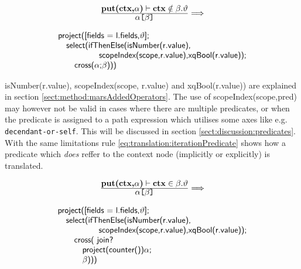 \begin{equation}
\centering
\begin{array}{c}
	\frac{\displaystyle \textbf{put(ctx,}\alpha\textbf{)}\vdash\textbf{ctx}\notin\beta.\vartheta}
	{\displaystyle \alpha\texttt{[}\beta\texttt{]}}

	\Longrightarrow 
	\\
	\mbox{}
	\\
	\begin{array}{l}
		\mbox{\textsf{project([fields = l.fields,}} \vartheta \mbox{\textsf{];}} 
		\\ \quad \mbox{\textsf{select(ifThenElse(isNumber(r.value),}} \\ \quad 
		\qquad\qquad \mbox{\textsf{scopeIndex(scope,r.value),xqBool(r.value));}} \\ \quad\quad
		\mbox{\textsf{cross(}} 
		\alpha \textsf{;}
		\beta \mbox{\textsf{)))}}
	\end{array}
\end{array}
\label{eq:translation:predicate}
\end{equation}


\textsf{isNumber(r.value), scopeIndex(scope, r.value)} and \textsf{xqBool(r.value))} are explained in section
\ref{sect:method:marsAddedOperators}. The use of \textsf{scopeIndex(scope,pred)} may however not be valid in cases
where there are multiple predicates, or when the predicate is assigned to a path expression which utilises some
axes like e.g. \texttt{decendant-or-self}. This will be discussed in section \ref{sect:discussion:predicates}.
With the same limitations rule \ref{eq:translation:iterationPredicate} shows how a predicate which \emph{does}
reffer to the context node (implicitly or explicitly) is translated.

\begin{equation}
\centering
\begin{array}{c}
	\frac{\displaystyle \textbf{put(ctx,}\alpha\textbf{)}\vdash\textbf{ctx}\in\beta.\vartheta}
	{\displaystyle \alpha\texttt{[}\beta\texttt{]}}

	\Longrightarrow 
	\\
	\mbox{}
	\\
	\begin{array}{l}
		\mbox{\textsf{project([fields = l.fields,}} \vartheta \mbox{\textsf{];}} 
		\\ \quad \mbox{\textsf{select(ifThenElse(isNumber(r.value),}} \\ \quad 
		\qquad\qquad \mbox{\textsf{scopeIndex(scope,r.value),xqBool(r.value));}} \\ \quad\quad
		\mbox{\textsf{cross( join?}} \\ \quad\quad\quad
		\mbox{\textsf{project(counter())}}\alpha \textsf{;} \\ \quad\quad\quad
		\beta \mbox{\textsf{)))}}
	\end{array}
\end{array}
\label{eq:translation:iterationPredicate}
\end{equation}

